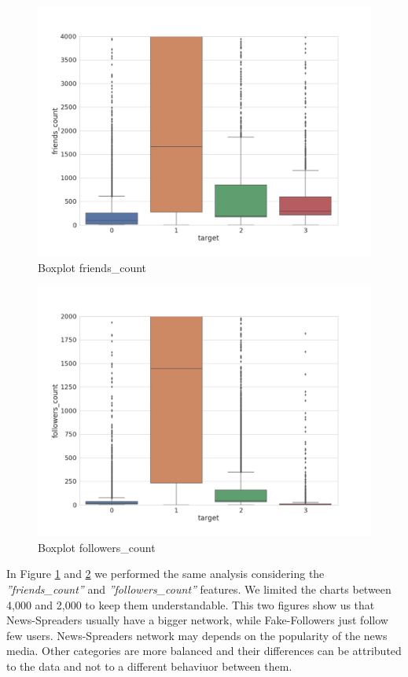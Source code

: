 \begin{figure}
	\centering
	\includegraphics[width=\columnwidth]{chapter3/figure/boxplot_friends.jpg}
	\caption{Boxplot friends\_count}
	\label{fig:box_friends}
\end{figure}

\begin{figure}
	\centering
	\includegraphics[width=\columnwidth]{chapter3/figure/boxplot_followers.jpg}
	\caption{Boxplot followers\_count}
	
	\label{fig:box_followers}
\end{figure}
In Figure \ref{fig:box_friends} and \ref{fig:box_followers} we performed the same analysis considering the \emph{''friends\_count''} and \emph{''followers\_count''} features. We limited the charts between 4,000 and 2,000 to keep them understandable. This two figures show us that News-Spreaders usually have a bigger network, while Fake-Followers just follow few users. News-Spreaders network may depends on the popularity of the news media. Other categories are more balanced and their differences can be attributed to the data and not to a different behaviuor between them.